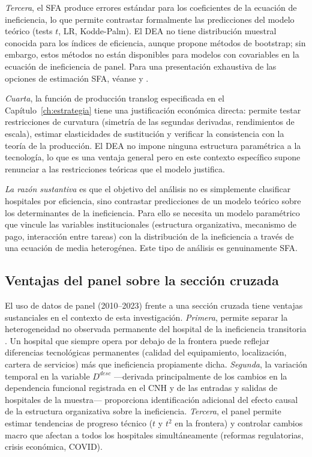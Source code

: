 \documentclass[12pt, a4paper, twoside, openright]{book}
\theoremstyle{plain}
\theoremstyle{definition}
\theoremstyle{remark}
\begin{document}
\textit{Tercera}, el SFA produce errores estándar para los coeficientes de la ecuación de ineficiencia, lo que permite contrastar formalmente las predicciones del modelo teórico (tests $t$, LR, Kodde-Palm). El DEA no tiene distribución muestral conocida para los índices de eficiencia, aunque \citet{simar2007} propone métodos de bootstrap; sin embargo, estos métodos no están disponibles para modelos con covariables en la ecuación de ineficiencia de panel. Para una presentación exhaustiva de las opciones de estimación SFA, véanse \citet{kumbhakar2000} y \citet{greene2008}.

\textit{Cuarta}, la función de producción translog especificada en el Capítulo~\ref{ch:estrategia} tiene una justificación económica directa: permite testar restricciones de curvatura (simetría de las segundas derivadas, rendimientos de escala), estimar elasticidades de sustitución y verificar la consistencia con la teoría de la producción. El DEA no impone ninguna estructura paramétrica a la tecnología, lo que es una ventaja general pero en este contexto específico supone renunciar a las restricciones teóricas que el modelo justifica.

\textit{La razón sustantiva} es que el objetivo del análisis no es simplemente clasificar hospitales por eficiencia, sino contrastar predicciones de un modelo teórico sobre los determinantes de la ineficiencia. Para ello se necesita un modelo paramétrico que vincule las variables institucionales (estructura organizativa, mecanismo de pago, interacción entre tareas) con la distribución de la ineficiencia a través de una ecuación de media heterogénea. Este tipo de análisis es genuinamente SFA.

\subsection{Ventajas del panel sobre la sección cruzada}

El uso de datos de panel (2010--2023) frente a una sección cruzada tiene ventajas sustanciales en el contexto de esta investigación. \textit{Primera}, permite separar la heterogeneidad no observada permanente del hospital de la ineficiencia transitoria \citep{greene2005a}. Un hospital que siempre opera por debajo de la frontera puede reflejar diferencias tecnológicas permanentes (calidad del equipamiento, localización, cartera de servicios) más que ineficiencia propiamente dicha. \textit{Segunda}, la variación temporal en la variable $D^{desc}$ ---derivada principalmente de los cambios en la dependencia funcional registrada en el CNH y de las entradas y salidas de hospitales de la muestra--- proporciona identificación adicional del efecto causal de la estructura organizativa sobre la ineficiencia. \textit{Tercera}, el panel permite estimar tendencias de progreso técnico ($t$ y $t^2$ en la frontera) y controlar cambios macro que afectan a todos los hospitales simultáneamente (reformas regulatorias, crisis económica, COVID).
\end{document}
